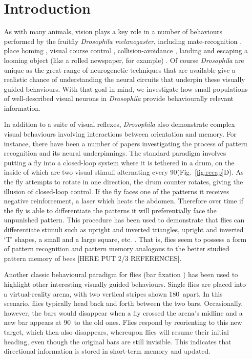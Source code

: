 \section*{Introduction}
As with many animals, vision plays a key role in a number of behaviours performed by the fruitfly \emph{Drosophila melanogaster}, including mate-recognition \cite{Agrawal2014}, place homing \cite{Ofstad2011}, visual course control \cite{Borst2014}, collision-avoidance \cite{Tammero2002}, landing \cite{Tammero2002} and escaping a looming object (like a rolled newspaper, for example) \cite{Card2008}.
Of course \emph{Drosophila} are unique as the great range of neurogenetic techniques that are available give a realistic chance of understanding the neural circuits that underpin these visually guided behaviours. With that goal in mind, we investigate how small populations of well-described visual neurons in \emph{Drosophila} provide behaviourally relevant information.

In addition to a suite of visual reflexes, \emph{Drosophila} also demonstrate complex visual behaviours involving interactions between orientation and memory.
For instance, there have been a number of papers investigating the process of pattern recognition and its neural underpinnings\cite{Pan2009,Liu2006,Ernst1999}.
The standard paradigm involves putting a fly into a closed-loop system where it is tethered in a drum, on the inside of which are two visual stimuli alternating every 90\degree (Fig.~\ref{fig:recap}D). As the fly attempts to rotate in one direction, the drum counter rotates, giving the illusion of closed-loop control. If the fly faces one of the patterns it receives negative reinforcement, a laser which heats the abdomen. Therefore over time if the fly is able to differentiate the patterns it will preferentially face the unpunished pattern. This procedure has been used to demonstrate that flies can differentiate stimuli such as upright and inverted triangles, upright and inverted `T' shapes, a small and a large square, etc. \cite{Ernst1999}. That is, flies seem to possess a form of pattern recognition and pattern memory analogous to the better studied pattern memory of bees [HERE PUT 2/3 REFERENCES].

Another classic behavioural paradigm for flies (bar fixation \cite{Neuser2008}) has been used to highlight other interesting visually guided behaviours.
Single flies are placed into a virtual-reality arena, with two vertical stripes shown 180\degree\ apart.
In this scenario, flies typically head back and forth between the two bars.
Occasionally, however, the bars would disappear when a fly crossed the arena's midline and a new bar appears at 90\degree\ to the old ones.
Flies respond by reorienting to this new target, which then also disappears, whereupon flies will resume their initial heading, even though the original bars are still invisible. This indicates that directional information is stored in short-term memory and updated.

